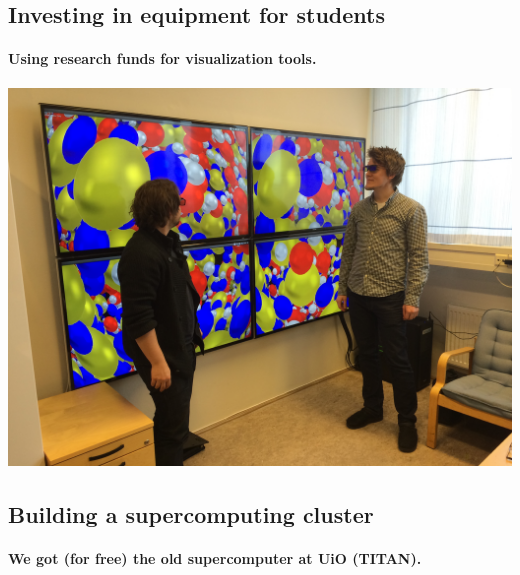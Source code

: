 \documentclass[%
oneside,                 %
final,                   %
10pt]{article}
\begin{document}
\noindent






\subsection{Investing in equipment for students}

\paragraph{Using research funds for visualization tools.}


\centerline{\includegraphics[width=0.7\linewidth]{fig-future/visualize.jpg}}




\subsection{Building a supercomputing cluster}

\paragraph{We got (for free) the old supercomputer at UiO (TITAN).}
\end{document}
